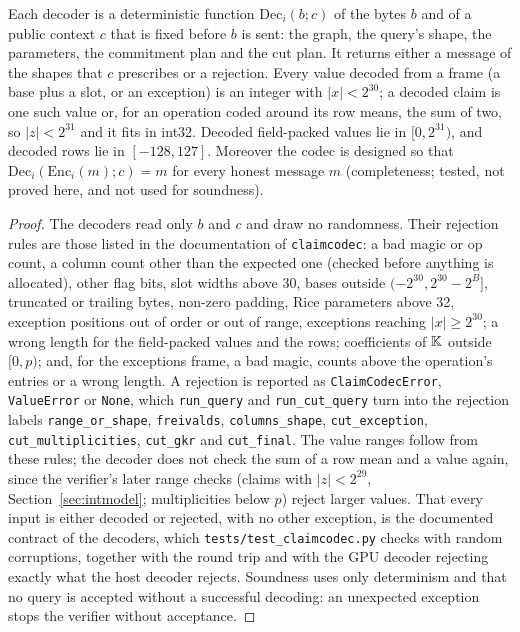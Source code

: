 \begin{lemma}
\label{lem:codec-dec}
Each decoder is a deterministic function $\mathrm{Dec}_i(b;c)$ of the bytes $b$ and of a public
context $c$ that is fixed before $b$ is sent: the graph, the query's shape, the parameters, the
commitment plan and the cut plan. It returns either a message of the shapes that $c$ prescribes or
a rejection. Every value decoded from a frame (a base plus a slot, or an exception) is an integer
with $|x|<2^{30}$; a decoded claim is one such value or, for an operation coded around its row means,
the sum of two, so $|z|<2^{31}$ and it fits in int32. Decoded field-packed values lie in
$[0,2^{31})$, and decoded rows lie in $[-128,127]$. Moreover the codec is designed so that
$\mathrm{Dec}_i(\mathrm{Enc}_i(m);c)=m$ for every honest message $m$ (completeness; tested, not
proved here, and not used for soundness).
\end{lemma}

\begin{proof}
The decoders read only $b$ and $c$ and draw no randomness. Their rejection rules are those listed
in the documentation of \texttt{claimcodec}: a bad magic or op count, a column count other than the
expected one (checked before anything is allocated), other flag bits, slot widths above 30, bases
outside $(-2^{30},2^{30}-2^B]$, truncated or trailing bytes, non-zero padding, Rice parameters above
32, exception positions out of order or out of range, exceptions reaching $|x|\ge2^{30}$; a wrong
length for the field-packed values and the rows; coefficients of $\mathbb{K}$ outside $[0,p)$; and, for
the exceptions frame, a bad magic, counts above the operation's entries or a wrong length. A
rejection is reported as \texttt{ClaimCodecError}, \texttt{ValueError} or \texttt{None}, which
\texttt{run\_query} and \texttt{run\_cut\_query} turn into the rejection labels
\texttt{range\_or\_shape}, \texttt{freivalds}, \texttt{columns\_shape}, \texttt{cut\_exception},
\texttt{cut\_multiplicities}, \texttt{cut\_gkr} and \texttt{cut\_final}. The value ranges follow from
these rules; the decoder does not check the sum of a row mean and a value again, since the
verifier's later range checks (claims with $|z|<2^{29}$, Section~\ref{sec:intmodel}; multiplicities
below $p$) reject larger values. That every input is either decoded or rejected, with no other exception, is the
documented contract of the decoders, which \texttt{tests/test\_claimcodec.py} checks with random
corruptions, together with the round trip and with the GPU decoder rejecting exactly what the host
decoder rejects. Soundness uses only determinism and that no query is accepted without a successful
decoding: an unexpected exception stops the verifier without acceptance.
\end{proof}

